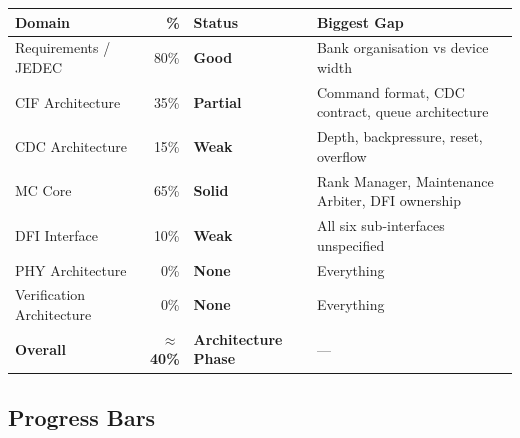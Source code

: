 \documentclass[10pt,a4paper]{article}
\newcommand{\Th}[1]{\cellcolor{thbg}\textbf{\small\color{acc1}#1}}
\newcommand{\RA}{\rowcolor{white}}
\newcommand{\RB}{\rowcolor{altbg}}
\begin{document}
\begin{center}
\begin{tabularx}{\linewidth}{@{} l r l X @{}}
\toprule
\Th{Domain} & \Th{\%} & \Th{Status} & \Th{Biggest Gap} \\
\midrule
\RA Requirements / JEDEC       & 80\% & \textcolor{acc3}{\textbf{Good}}    & Bank organisation vs device width \\
\RB CIF Architecture           & 35\% & \textcolor{acc2}{\textbf{Partial}} & Command format, CDC contract, queue architecture \\
\RA CDC Architecture           & 15\% & \textcolor{critbdr}{\textbf{Weak}} & Depth, backpressure, reset, overflow \\
\RB MC Core                    & 65\% & \textcolor{acc3}{\textbf{Solid}}   & Rank Manager, Maintenance Arbiter, DFI ownership \\
\RA DFI Interface              & 10\% & \textcolor{critbdr}{\textbf{Weak}} & All six sub-interfaces unspecified \\
\RB PHY Architecture           &  0\% & \textcolor{critbdr}{\textbf{None}} & Everything \\
\RA Verification Architecture  &  0\% & \textcolor{critbdr}{\textbf{None}} & Everything \\
\midrule
\RA \textbf{Overall}           & \textbf{$\approx$40\%} & \textcolor{acc2}{\textbf{Architecture Phase}} & --- \\
\bottomrule
\end{tabularx}
\end{center}

\subsection{Progress Bars}
\end{document}
